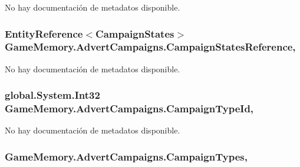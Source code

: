 No hay documentación de metadatos disponible. 

\hypertarget{class_game_memory_1_1_advert_campaigns_a2b666e7a41a4408e76ca8cb79c99ad7b}{
\subsubsection[{Campaign\-States\-Reference}]{\setlength{\rightskip}{0pt plus 5cm}Entity\-Reference$<${\bf Campaign\-States}$>$ Game\-Memory.\-Advert\-Campaigns.\-Campaign\-States\-Reference\hspace{0.3cm}{\ttfamily [get]}, {\ttfamily [set]}}}\label{class_game_memory_1_1_advert_campaigns_a2b666e7a41a4408e76ca8cb79c99ad7b}


No hay documentación de metadatos disponible. 

\hypertarget{class_game_memory_1_1_advert_campaigns_a8ea07608b924d2ab48832ead8bd743a1}{
\subsubsection[{Campaign\-Type\-Id}]{\setlength{\rightskip}{0pt plus 5cm}global.\-System.\-Int32 Game\-Memory.\-Advert\-Campaigns.\-Campaign\-Type\-Id\hspace{0.3cm}{\ttfamily [get]}, {\ttfamily [set]}}}\label{class_game_memory_1_1_advert_campaigns_a8ea07608b924d2ab48832ead8bd743a1}


No hay documentación de metadatos disponible. 

\hypertarget{class_game_memory_1_1_advert_campaigns_a2248329f3b61f4745a02e612e9f597bb}{
\subsubsection[{Campaign\-Types}]{ Game\-Memory.\-Advert\-Campaigns.\-Campaign\-Types\hspace{0.3cm}{\ttfamily [get]}, {\ttfamily [set]}}}\label{class_game_memory_1_1_advert_campaigns_a2248329f3b61f4745a02e612e9f597bb}


